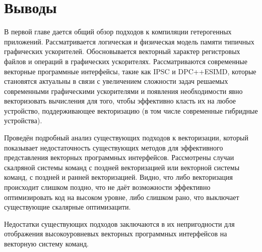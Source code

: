 \section{Выводы}\label{sec:overview/outcome}

В первой главе дается общий обзор подходов к компиляции гетерогенных приложений. Рассматривается логическая и физическая модель памяти типичных графических ускорителей. Обосновывается векторный характер регистровых файлов и операций в графических ускорителях. Рассматриваются современные векторные программные интерфейсы, такие как IPSC и DPC++ESIMD, которые становятся актуальны в связи с увеличением сложности задач решаемых современными графическими ускорителями и появления необходимости явно векторизовать вычисления для того, чтобы эффективно класть их на любое устройство, поддерживающее векторизацию (в том числе современные гибридные устройства). 

Проведён подробный анализ существующих подходов к векторизации, который показывает недостаточность существующих методов для эффективного представления векторных программных интерфейсов. Рассмотрены случаи скалряной системы команд с поздней векторизацией или векторной системы команд, с поздней и ранней векторизацией. Видно, что либо векторизация происходит слишком поздно, что не даёт возможности эффективно оптимизировать код на высоком уровне, либо слишком рано, что выключает существующие скалярные оптимизацити.

Недостатки существующих подходов заключаются в их непригодности для отображения высокоуровневых векторных программных интерфейсов на векторную систему команд.

\FloatBarrier